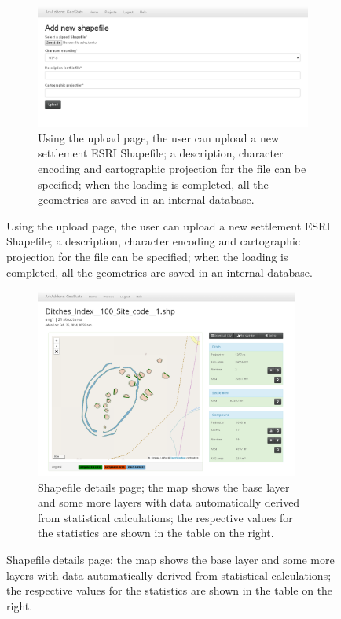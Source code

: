             \begin{figure}[H]
                \ContinuedFloat
                \begin{subfigure}[b]{1\textwidth}
                    \centering
                    \includegraphics[width=1\textwidth]{img/shp-upload}
                    \caption{Using the upload page, the user can upload a new settlement ESRI Shapefile; a description, character encoding and cartographic projection for the file can be specified; when the loading is completed, all the geometries are saved in an internal database.}
                    \label{fig:shp-upload}
                \end{subfigure}

            \end{figure}

            \pagebreak

            \vfill

            \begin{figure}[H]
                \ContinuedFloat
                \begin{subfigure}[b]{1\textwidth}
                    \centering
                    \includegraphics[width=0.95\textwidth]{img/shp-details}
                    \caption{Shapefile details page; the map shows the base layer and some more layers with data automatically derived from statistical calculations; the respective values for the statistics are shown in the table on the right.}
                    \label{fig:shp-details}
                \end{subfigure}
            \end{figure}

